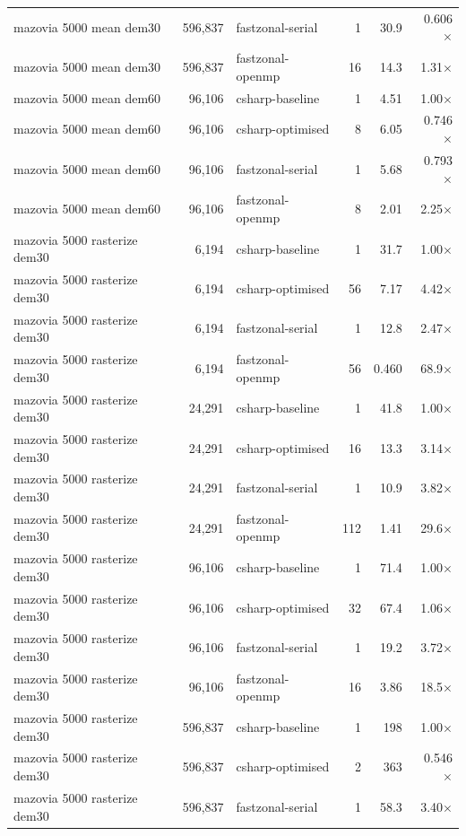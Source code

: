 \begin{tabular}{lrlrrr}
mazovia 5000 mean dem30 & 596,837 & fastzonal-serial & 1 & 30.9 & 0.606$\times$ \\
mazovia 5000 mean dem30 & 596,837 & fastzonal-openmp & 16 & 14.3 & 1.31$\times$ \\
mazovia 5000 mean dem60 & 96,106 & csharp-baseline & 1 & 4.51 & 1.00$\times$ \\
mazovia 5000 mean dem60 & 96,106 & csharp-optimised & 8 & 6.05 & 0.746$\times$ \\
mazovia 5000 mean dem60 & 96,106 & fastzonal-serial & 1 & 5.68 & 0.793$\times$ \\
mazovia 5000 mean dem60 & 96,106 & fastzonal-openmp & 8 & 2.01 & 2.25$\times$ \\
mazovia 5000 rasterize dem30 & 6,194 & csharp-baseline & 1 & 31.7 & 1.00$\times$ \\
mazovia 5000 rasterize dem30 & 6,194 & csharp-optimised & 56 & 7.17 & 4.42$\times$ \\
mazovia 5000 rasterize dem30 & 6,194 & fastzonal-serial & 1 & 12.8 & 2.47$\times$ \\
mazovia 5000 rasterize dem30 & 6,194 & fastzonal-openmp & 56 & 0.460 & 68.9$\times$ \\
mazovia 5000 rasterize dem30 & 24,291 & csharp-baseline & 1 & 41.8 & 1.00$\times$ \\
mazovia 5000 rasterize dem30 & 24,291 & csharp-optimised & 16 & 13.3 & 3.14$\times$ \\
mazovia 5000 rasterize dem30 & 24,291 & fastzonal-serial & 1 & 10.9 & 3.82$\times$ \\
mazovia 5000 rasterize dem30 & 24,291 & fastzonal-openmp & 112 & 1.41 & 29.6$\times$ \\
mazovia 5000 rasterize dem30 & 96,106 & csharp-baseline & 1 & 71.4 & 1.00$\times$ \\
mazovia 5000 rasterize dem30 & 96,106 & csharp-optimised & 32 & 67.4 & 1.06$\times$ \\
mazovia 5000 rasterize dem30 & 96,106 & fastzonal-serial & 1 & 19.2 & 3.72$\times$ \\
mazovia 5000 rasterize dem30 & 96,106 & fastzonal-openmp & 16 & 3.86 & 18.5$\times$ \\
mazovia 5000 rasterize dem30 & 596,837 & csharp-baseline & 1 & 198 & 1.00$\times$ \\
mazovia 5000 rasterize dem30 & 596,837 & csharp-optimised & 2 & 363 & 0.546$\times$ \\
mazovia 5000 rasterize dem30 & 596,837 & fastzonal-serial & 1 & 58.3 & 3.40$\times$ \\

\end{tabular}
